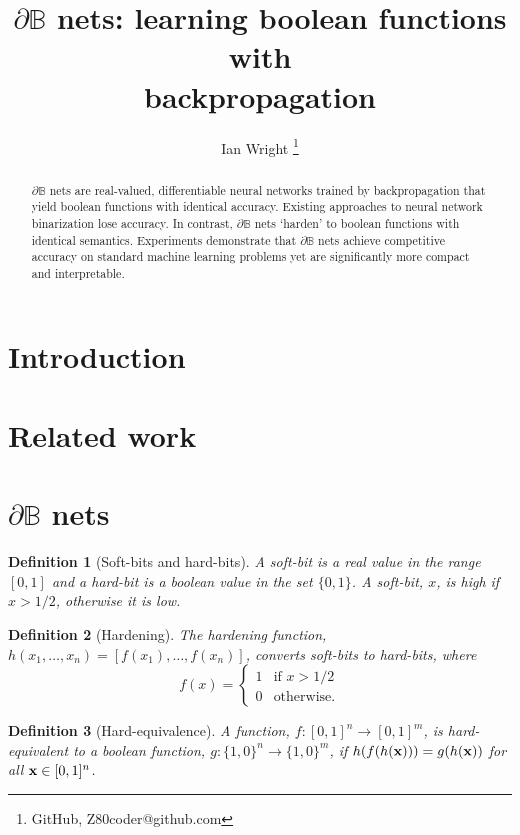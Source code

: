 \documentclass{article} %
\title{$\partial\mathbb{B}$ nets: learning boolean functions with\\backpropagation}
\author{Ian Wright \thanks{GitHub, Z80coder@github.com}
}
\newtheorem*{definition}{Definition}
\begin{document}
\maketitle

\begin{abstract}
	$\partial\mathbb{B}$ nets are real-valued, differentiable neural networks 
	trained by backpropagation that yield boolean functions with identical accuracy.
	Existing approaches to neural network binarization lose accuracy. In contrast, 
	$\partial\mathbb{B}$ nets `harden' to boolean functions with identical semantics.  Experiments demonstrate that $\partial\mathbb{B}$ nets achieve competitive accuracy on standard machine learning problems yet are significantly more compact and interpretable.
\end{abstract}

\section{Introduction}

\section{Related work}

\section{$\partial\mathbb{B}$ nets}

\begin{definition}[Soft-bits and hard-bits]
A {\em soft-bit} is a real value in the range $[0,1]$ and a {\em hard-bit} is a boolean value in the set $\{0,1\}$. A soft-bit, $x$, is {\em high} if $x>1/2$, otherwise it is {\em low}.
\end{definition}

\begin{definition}[Hardening]
The {\em hardening} function, $h(x_{1}, \dots, x_{n}) = [f(x_{1}), \dots, f(x_{n})]$, converts soft-bits to hard-bits, where
\begin{equation*}
f(x) =
\begin{cases}
1 & \text{if } x > 1/2 \\
0 & \text{otherwise.}
\end{cases}
\end{equation*}
\end{definition}

\begin{definition}[Hard-equivalence]
	A function, $f: [0,1]^n \rightarrow [0,1]^m$, is {\em hard-equivalent} to a boolean function, $g: \{1,0\}^n \rightarrow \{1,0\}^m$,	if
	$h(f(h({\bf x}))) = g(h({\bf x}))$ for all ${\bf x} \in [0,1]^{n}$.
\end{definition}
\end{document}
